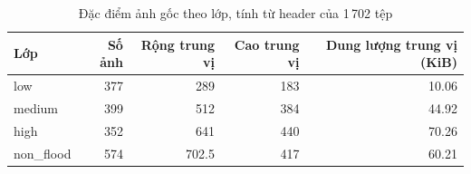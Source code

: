 \begin{table}[H]\centering\small
\caption{Đặc điểm ảnh gốc theo lớp, tính từ header của 1\,702 tệp}\label{tab:image-profile}
\begin{tabular}{lrrrr}
\toprule Lớp & Số ảnh & Rộng trung vị & Cao trung vị & Dung lượng trung vị (KiB) \\
\midrule
low & 377 & 289 & 183 & 10.06 \\
medium & 399 & 512 & 384 & 44.92 \\
high & 352 & 641 & 440 & 70.26 \\
non\_flood & 574 & 702.5 & 417 & 60.21 \\
\bottomrule\end{tabular}
\end{table}
